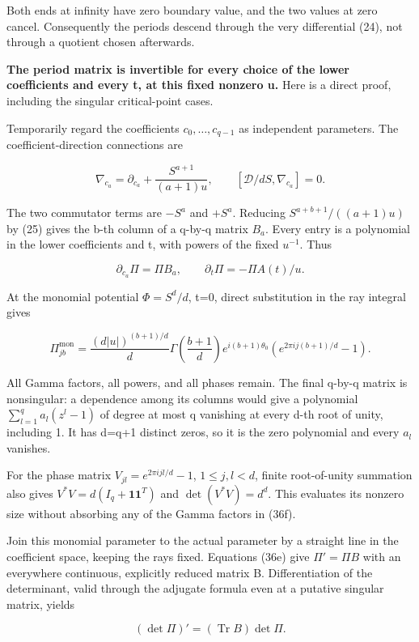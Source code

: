 \documentclass[
  11pt,
]{article}
\begin{document}
Both ends at infinity have zero boundary value, and the two values at
zero cancel. Consequently the periods descend through the very
differential (24), not through a quotient chosen afterwards.

\textbf{The period matrix is invertible for every choice of the lower
coefficients and every t, at this fixed nonzero u.} Here is a direct
proof, including the singular critical-point cases.

Temporarily regard the coefficients \(c_0,\ldots,c_{q-1}\) as
independent parameters. The coefficient-direction connections are

\[
\nabla_{c_a}=\partial_{c_a}+\frac{S^{a+1}}{(a+1)u},
\qquad [\mathcal D/dS,\nabla_{c_a}]=0.
\tag{36d}
\]

The two commutator terms are \(-S^a\) and \(+S^a\). Reducing
\(S^{a+b+1}/((a+1)u)\) by (25) gives the b-th column of a q-by-q matrix
\(B_a\). Every entry is a polynomial in the lower coefficients and t,
with powers of the fixed \(u^{-1}\). Thus

\[
\partial_{c_a}\Pi=\Pi B_a,\qquad
\partial_t\Pi=-\Pi A(t)/u.
\tag{36e}
\]

At the monomial potential \(\Phi=S^d/d\), t=0, direct substitution in
the ray integral gives

\[
\Pi_{jb}^{\mathrm{mon}}
=\frac{(d|u|)^{(b+1)/d}}{d}
\Gamma\!\left(\frac{b+1}{d}\right)
 e^{i(b+1)\theta_0}
 \left(e^{2\pi i j(b+1)/d}-1\right).
\tag{36f}
\]

All Gamma factors, all powers, and all phases remain. The final q-by-q
matrix is nonsingular: a dependence among its columns would give a
polynomial \(\sum_{l=1}^{q}a_l(z^l-1)\) of degree at most q vanishing at
every d-th root of unity, including 1. It has d=q+1 distinct zeros, so
it is the zero polynomial and every \(a_l\) vanishes.

For the phase matrix \(V_{jl}=e^{2\pi i jl/d}-1\), \(1\le j,l<d\),
finite root-of-unity summation also gives
\(V^*V=d(I_q+\mathbf1\mathbf1^T)\) and \(\det(V^*V)=d^d\). This
evaluates its nonzero size without absorbing any of the Gamma factors in
(36f).

Join this monomial parameter to the actual parameter by a straight line
in the coefficient space, keeping the rays fixed. Equations (36e) give
\(\Pi'=\Pi B\) with an everywhere continuous, explicitly reduced matrix
B. Differentiation of the determinant, valid through the adjugate
formula even at a putative singular matrix, yields

\[
(\det\Pi)'=(\operatorname{Tr}B)\det\Pi.
\tag{36g}
\]
\end{document}
